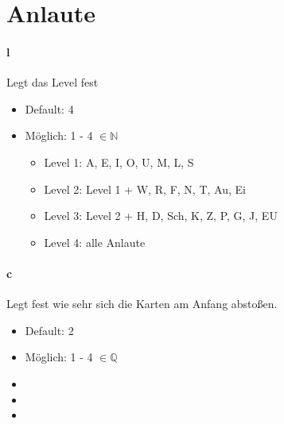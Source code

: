 \documentclass[]{article}
\begin{document}
\section{Anlaute}
\begin{multicols}{2}
	\paragraph{l} Legt das Level fest
	\begin{itemize}
		\item Default: 4
		\item Möglich: 1 - 4 $\in \mathbb{N}$
			\begin{itemize}
				\item Level 1: A, E, I, O, U, M, L, S
				\item Level 2: Level 1 + W, R, F, N, T, Au, Ei
				\item Level 3: Level 2 + H, D, Sch, K, Z, P, G, J, EU
				\item Level 4: alle Anlaute
			\end{itemize}
	\end{itemize}

	\paragraph{c} Legt fest wie sehr sich die Karten am Anfang abstoßen.
	\begin{itemize}
		\item Default: 2
		\item Möglich: 1 - 4 $\in \mathbb{Q}$
		\item[]
		\item[]
		\item[]
	\end{itemize}
\end{multicols}
\end{document}
